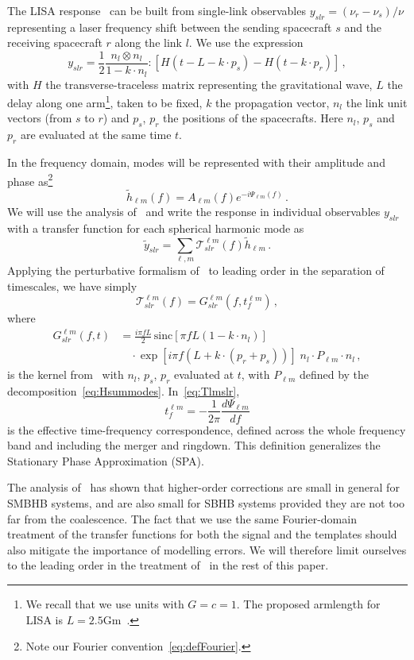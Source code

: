 \documentclass[aps,showpacs,twocolumn,prd,superscriptaddress,nofootinbib]{revtex4-1}
\newcommand{\be}{\begin{equation}}
\newcommand{\ee}{\end{equation}}
\newcommand\calT{{\mathcal{T}}}
\newcommand{\nn}{\nonumber}
\newcommand{\sinc}{\,\mathrm{sinc}}
\begin{document}
The LISA response~\cite{EW75, Cutler97, Larson+99, CR02, RCP04} can be built from single-link observables $y_{slr} = (\nu_{r} - \nu_{s})/\nu$ representing a laser frequency shift between the sending spacecraft $s$ and the receiving spacecraft $r$ along the link $l$. We use the expression~\cite{Vallisneri04, Krolak+04}
\be\label{eq:defyslr}
	y_{slr} = \frac{1}{2} \frac{n_{l} \otimes n_{l}}{1 - k\cdot n_{l}} : \left[ H(t - L - k\cdot p_{s}) - H(t - k\cdot p_{r}) \right] \,,
\ee
with $H$ the transverse-traceless matrix representing the gravitational wave, $L$ the delay along one arm\footnote{We recall that we use units with $G=c=1$. The proposed armlength for LISA is $L = 2.5\mathrm{Gm}$~\cite{LISA2017}.}, taken to be fixed, $k$ the propagation vector, $n_{l}$ the link unit vectors (from $s$ to $r$) and $p_{s}$, $p_{r}$ the positions of the spacecrafts. Here $n_{l}$, $p_{s}$ and $p_{r}$ are evaluated at the same time $t$.

In the frequency domain, modes will be represented with their amplitude and phase as\footnote{Note our Fourier convention~\eqref{eq:defFourier}.}
\be\label{eq:hlmampphase}
	\tilde{h}_{\ell m} (f) = A_{\ell m} (f) e^{-i\Psi_{\ell m} (f)}\,.
\ee
We will use the analysis of~\cite{MB18} and write the response in individual observables $y_{slr}$ with a transfer function for each spherical harmonic mode as
\be
	\tilde{y}_{slr} = \sum_{\ell, m}\calT_{slr}^{\ell m}(f) \tilde{h}_{\ell m} \,.
\ee
Applying the perturbative formalism of~\cite{MB18} to leading order in the separation of timescales, we have simply
\be\label{eq:Tlmslr}
	\calT_{slr}^{\ell m}(f) = G_{slr}^{\ell m}(f, t_{f}^{\ell m}) \,,
\ee
where
\begin{align}\label{eq:Gslr}
	G_{slr}^{\ell m}(f,t) &= \frac{i \pi f L}{2} \sinc \left[ \pi f L\left(1-k\cdot n_{l} \right) \right] \nn\\
	& \quad \cdot \exp\left[ i \pi f \left( L + k\cdot \left( p_{r} + p_{s} \right) \right) \right] \; n_{l} \cdot P_{\ell m} \cdot n_{l} \,,
\end{align}
is the kernel from~\cite{MB18} with $n_{l}$, $p_{s}$, $p_{r}$ evaluated at $t$, with $P_{\ell m}$ defined by the decomposition~\eqref{eq:Hsummodes}. In~\eqref{eq:Tlmslr},
\be\label{eq:deftflm}
	t_{f}^{\ell m} = -\frac{1}{2\pi} \frac{d\Psi_{\ell m}}{df}
\ee
is the effective time-frequency correspondence, defined across the whole frequency band and including the merger and ringdown. This definition generalizes the Stationary Phase Approximation (SPA).

The analysis of~\cite{MB18} has shown that higher-order corrections are small in general for SMBHB systems, and are also small for SBHB systems provided they are not too far from the coalescence. The fact that we use the same Fourier-domain treatment of the transfer functions for both the signal and the templates should also mitigate the importance of modelling errors. We will therefore limit ourselves to the leading order in the treatment of~\cite{MB18} in the rest of this paper.
\end{document}
